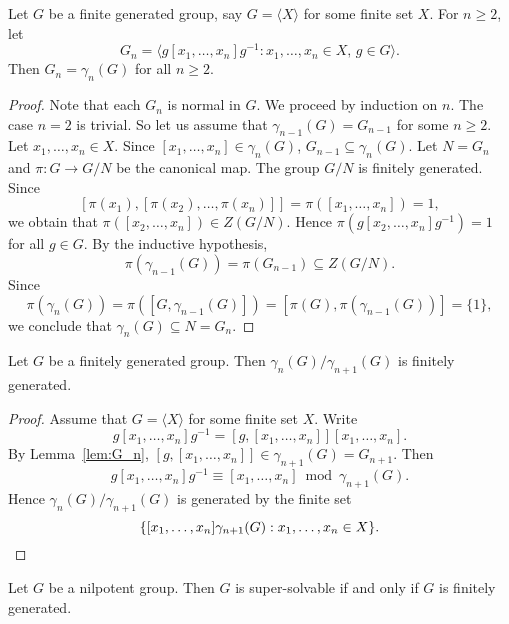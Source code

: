 \begin{lemma}
	\label{lem:G_n}
	Let $G$ be a finite generated group, say $G=\langle X\rangle$ for some finite set $X$.  
	For $n\geq2$, let 
 	\[
		G_n=\langle g[x_1,\dots,x_n]g^{-1}:x_1,\dots,x_n\in X,\,g\in G\rangle.
	\]
	Then $G_n=\gamma_n(G)$ for all $n\geq2$. 
\end{lemma}

\begin{proof}
	Note that each $G_n$ is normal in $G$. We proceed by induction on $n$. The case 
    $n=2$ is trivial. So let us assume that 
    $\gamma_{n-1}(G)=G_{n-1}$ for some $n\geq2$. Let $x_1,\dots,x_n\in X$. Since 
	$[x_1,\dots,x_n]\in\gamma_{n}(G)$, $G_{n-1}\subseteq\gamma_n(G)$. Let 
	$N=G_n$ and $\pi\colon G\to G/N$ be the canonical map. The group $G/N$ is finitely generated. Since 
	\[
	[\pi(x_1),[\pi(x_2),\dots,\pi(x_{n})]]=\pi([x_1,\dots,x_n])=1,
	\]
	we obtain that $\pi([x_2,\dots,x_{n}])\in Z(G/N)$. Hence 
	$\pi(g[x_2,\dots,x_n]g^{-1})=1$ for all $g\in G$. By the inductive hypothesis, 
 	\[
	\pi(\gamma_{n-1}(G))=\pi(G_{n-1})\subseteq Z(G/N).
	\]
	Since  
	\[
	\pi(\gamma_{n}(G))=\pi([G,\gamma_{n-1}(G)])=[\pi(G),\pi(\gamma_{n-1}(G))]=\{1\},
	\]
	we conclude that $\gamma_n(G)\subseteq N=G_n$.
\end{proof}

\begin{lemma}
	\label{lem:gamma_n/gamma_n+1}
	Let $G$ be a finitely generated group. Then 
 	$\gamma_n(G)/\gamma_{n+1}(G)$ is finitely generated. 
\end{lemma}

\begin{proof}
	Assume that $G=\langle X\rangle$ for some finite set $X$. Write 
	\[
	g[x_1,\dots,x_n]g^{-1}=[g,[x_1,\dots,x_n]][x_1,\dots,x_n]. 
	\]
	By Lemma~\ref{lem:G_n}, 
    $[g,[x_1,\dots,x_n]]\in \gamma_{n+1}(G)=G_{n+1}$. Then 
	\[
	g[x_1,\dots,x_n]g^{-1}\equiv [x_1,\dots,x_n]\bmod \gamma_{n+1}(G). 
	\]
	Hence $\gamma_{n}(G)/\gamma_{n+1}(G)$ is generated by the finite set 
	\[
	\{[x_1,\dots,x_n]\gamma_{n+1}(G):x_1,\dots,x_n\in X\}. \qedhere 
	\]
\end{proof}

\begin{theorem}
    \label{thm:super=fg}
    Let $G$ be a nilpotent group. Then $G$ is super-solvable if and only if 
    $G$ is finitely generated. 
\end{theorem}

